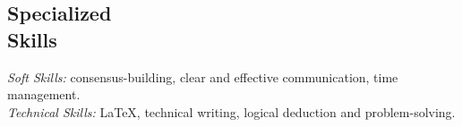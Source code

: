 \documentclass[margin, 12pt]{res} %
\begin{document}
\begin{resume}

\section{\sc Specialized \\ Skills} 
{\sl Soft Skills:} consensus-building, clear and effective communication, time management.\\
{\sl Technical Skills:} \LaTeX, technical writing, logical deduction and problem-solving.

\end{resume}
\end{document}
